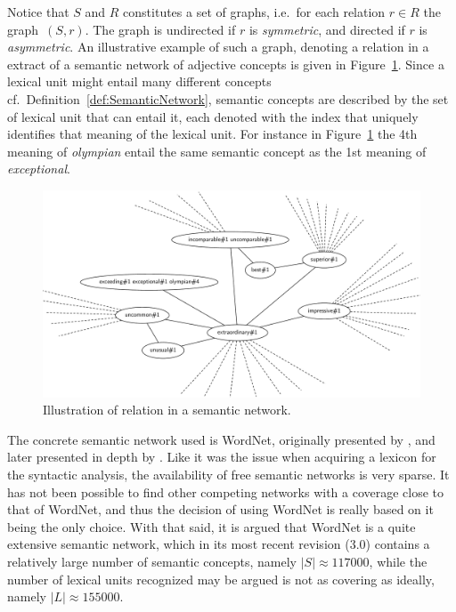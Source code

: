 Notice that $S$ and $R$ constitutes a set of graphs, i.e.\ for each relation $r \in R$ the graph~$(S,r)$. The graph is undirected if $r$ is \emph{symmetric}, and directed if $r$ is \emph{asymmetric}. An illustrative example of such a graph, denoting a relation in a extract of a semantic network of adjective concepts is given in Figure~\ref{fig:semanticNetwork}.  Since a lexical unit might entail many different concepts cf.\ Definition~\ref{def:SemanticNetwork}, semantic concepts are described by the set of lexical unit that can entail it, each denoted with the index that uniquely identifies that meaning of the lexical unit. For instance in Figure~\ref{fig:semanticNetwork} the 4th meaning of \emph{olympian} entail the same semantic concept as the 1st meaning of \emph{exceptional}.

\begin{figure}[ht]
  \center
  \includegraphics[scale=.27]{Figures/Exceptional}
  \caption{Illustration of relation in a semantic network.}
  \label{fig:semanticNetwork}
\end{figure}

The concrete semantic network used is WordNet, originally presented by \citeauthor{wordnet} , and later presented in depth by \citeauthor{wordnetBook} . Like it was the issue when acquiring a lexicon for the syntactic analysis, the availability of free semantic networks is very sparse. It has not been possible to find other competing networks with a coverage close to that of WordNet, and thus the decision of using WordNet is really based on it being the only choice. With that said, it is argued that WordNet is a quite extensive semantic network, which in its most recent revision (3.0) contains a relatively large number of semantic concepts, namely $|S| \approx \num{117000}$, while the number of lexical units recognized may be argued is not as covering as ideally, namely $|L| \approx \num{155000}$.

